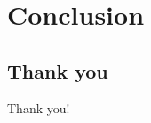 \section{Conclusion}

\subsection{Thank you}
\begin{frame}
\begin{center}
\Huge{Thank you!}
\end{center}
\end{frame}


